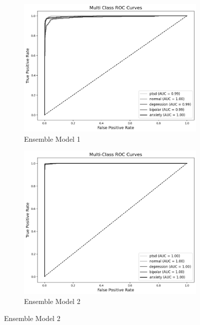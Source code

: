 \pagebreak

\begin{figure}[H]
    \centering
    \begin{subfigure}[b]{0.49\textwidth}
        \centering
        \includegraphics[width=\textwidth]{Images/EM ROC.png}
        \caption{Ensemble Model 1}
        \label{dfdl12443}  %
    \end{subfigure}
    \hfill
    \begin{subfigure}[b]{0.47\textwidth}
        \centering
        \includegraphics[width=\textwidth]{Images/EM2 ROC.png}
        \caption{Ensemble Model 2}

\end{subfigure}
\end{figure}
